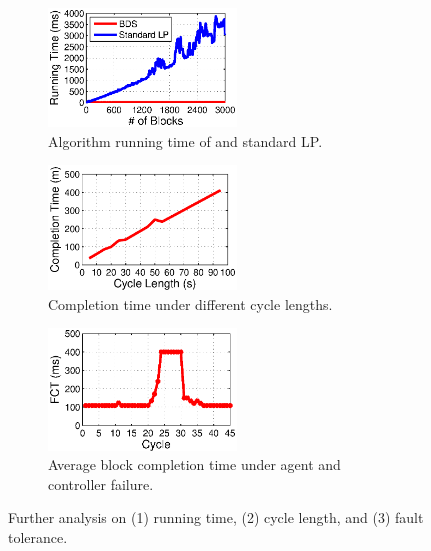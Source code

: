 \begin{figure}[t]
        \centering
        \begin{subfigure}[b]{0.3\textwidth}
                \centering
                \includegraphics[width=50mm]{images/BDSvsLP.eps} %
                \caption{Algorithm running time of \name and standard LP.}
                \label{fig:further:BDSvsLP}
        \end{subfigure}
        \begin{subfigure}[b]{0.3\textwidth}
                \centering
                \includegraphics[width=50mm]{images/cycleDiff.eps}%
                \caption{Completion time under different cycle lengths.}
                \label{fig:further:cycleDiff}
        \end{subfigure}
        \begin{subfigure}[b]{0.3\textwidth}
                \centering
                \includegraphics[width=50mm]{images/failure.eps}%
                \caption{Average block completion time under agent and controller failure.}
                \label{fig:further:failure}
        \end{subfigure}
        \caption{Further analysis on (1) running time, (2) cycle length, and (3) fault tolerance.}
        \label{fig:further}
\vspace{-0.4cm}
\end{figure}

